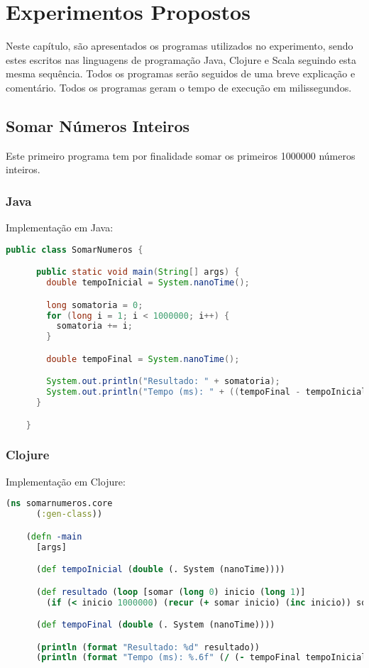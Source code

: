 \chapter{Experimentos Propostos}

\vspace{-1.9cm}

Neste capítulo, são apresentados os programas utilizados no experimento, sendo estes escritos nas linguagens de programação Java, Clojure e Scala seguindo esta mesma sequência. Todos os programas serão seguidos de uma breve explicação e comentário. Todos os programas geram o tempo de execução em milissegundos.

\section{Somar Números Inteiros}

  Este primeiro programa tem por finalidade somar os primeiros 1000000 números inteiros.

  \subsection{Java}

     Implementação em Java:

    \begin{lstlisting}[language=Java, mathescape=false]
    public class SomarNumeros {

      public static void main(String[] args) {
        double tempoInicial = System.nanoTime();

        long somatoria = 0;
        for (long i = 1; i < 1000000; i++) {
          somatoria += i;
        }

        double tempoFinal = System.nanoTime();

        System.out.println("Resultado: " + somatoria);
        System.out.println("Tempo (ms): " + ((tempoFinal - tempoInicial) / 1000000));
      }

    }
    \end{lstlisting}

  \subsection{Clojure}

    Implementação em Clojure:

    \begin{lstlisting}[language=Clojure, mathescape=false]
    (ns somarnumeros.core
      (:gen-class))

    (defn -main
      [args]

      (def tempoInicial (double (. System (nanoTime))))

      (def resultado (loop [somar (long 0) inicio (long 1)]
        (if (< inicio 1000000) (recur (+ somar inicio) (inc inicio)) somar)))

      (def tempoFinal (double (. System (nanoTime))))

      (println (format "Resultado: %d" resultado))
      (println (format "Tempo (ms): %.6f" (/ (- tempoFinal tempoInicial) 1000000))))
    \end{lstlisting}

